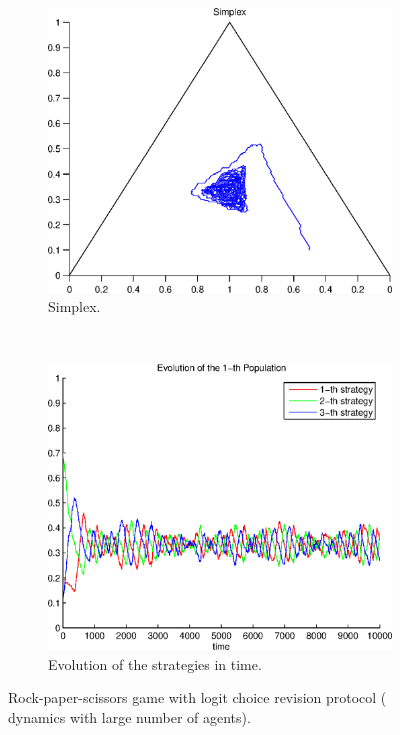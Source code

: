 \begin{figure}
  \centering
  \begin{subfigure}[b]{0.45\textwidth}
	  \includegraphics[width=\textwidth]{./images/test_finite_logit_choice.eps}
	  \caption{Simplex.}
	  \label{fig:finite4_simplex}
  \end{subfigure}
  ~ 
  \begin{subfigure}[b]{0.45\textwidth}
	  \includegraphics[width=\textwidth]{./images/test_finite_logit_choice_ev.eps}
	  \caption{Evolution of the strategies in time.}
	  \label{fig:finite4_ev}
  \end{subfigure}
  \caption{Rock-paper-scissors game with logit choice revision protocol ( dynamics with large number of agents).}
  \label{fig:finite4}
\end{figure}




